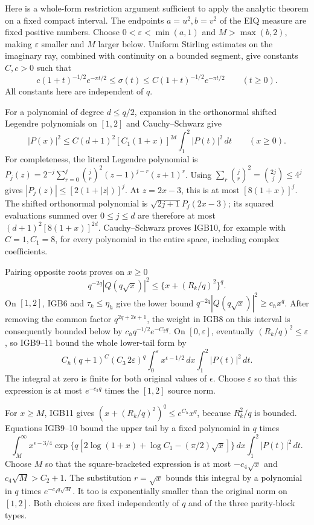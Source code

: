 Here is a whole-form restriction argument sufficient to apply the
analytic theorem on a fixed compact interval. The endpoints
$a=u^2,b=v^2$ of the EIQ measure are fixed positive numbers.
Choose $0<\varepsilon<\min(a,1)$ and $M>\max(b,2)$, making
$\varepsilon$ smaller and $M$ larger below.
Uniform Stirling estimates on the imaginary ray, combined with
continuity on a bounded segment, give constants $C,c>0$ such that
\[
 c(1+t)^{-1/2}e^{-\pi t/2}
 \leq\sigma(t)\leq
 C(1+t)^{-1/2}e^{-\pi t/2}\qquad(t\geq0).
 \tag{IGB9}
\]
All constants here are independent of $q$.

For a polynomial of degree $d\leq q/2$, expansion in the
orthonormal shifted Legendre polynomials on $[1,2]$ and
Cauchy--Schwarz give
\[
 |P(x)|^2\leq C(d+1)^2
        [C_1(1+x)]^{2d}\int_1^2|P(t)|^2\,dt
       \qquad(x\geq0).
 \tag{IGB10}
\]
For completeness, the literal Legendre polynomial is
$P_j(z)=2^{-j}\sum_{r=0}^j\binom jr^2
(z-1)^{j-r}(z+1)^r$.
Using $\sum_r\binom jr^2=\binom{2j}j\leq4^j$ gives
$|P_j(z)|\leq[2(1+|z|)]^j$.
At $z=2x-3$, this is at most $[8(1+x)]^j$.
The shifted orthonormal polynomial is
$\sqrt{2j+1}P_j(2x-3)$; its squared evaluations summed over
$0\leq j\leq d$ are therefore at most
$(d+1)^2[8(1+x)]^{2d}$.
Cauchy--Schwarz proves IGB10, for example with $C=1,C_1=8$,
for every polynomial in the entire space, including complex coefficients.

Pairing opposite roots proves on $x\geq0$
\[
 q^{-2q}|Q(q\sqrt{x})|^2
 \leq \{x+(R_k/q)^2\}^{q}.
 \tag{IGB11}
\]
On $[1,2]$, IGB6 and $\tau_k\leq\eta_h$ give the lower bound
$q^{-2q}|Q(q\sqrt{x})|^2\geq c_hx^q$.
After removing the common factor $q^{2q+2\epsilon+1}$,
the weight in IGB8 on this interval is consequently bounded
below by $c_hq^{-1/2}e^{-C_2q}$. On $[0,\varepsilon]$,
eventually $(R_k/q)^2\leq\varepsilon$, so IGB9--11 bound the
whole lower-tail form by
\[
 C_h(q+1)^C(C_3\,2\varepsilon)^q
       \int_0^\varepsilon x^{\epsilon-1/2}\,dx
       \int_1^2|P(t)|^2\,dt.
\]
The integral at zero is finite for both original values of
$\epsilon$. Choose $\varepsilon$ so that this expression
is at most $e^{-c_3q}$ times the $[1,2]$ source norm.

For $x\geq M$, IGB11 gives
$(x+(R_k/q)^2)^q\leq e^{C_h}x^q$, because
$R_k^2/q$ is bounded. Equations IGB9--10 bound the upper tail
by a fixed polynomial in $q$ times
\[
 \int_M^\infty x^{\epsilon-3/4}
  \exp\{q[2\log(1+x)+\log C_1-(\pi/2)\sqrt{x}]\}\,dx
       \int_1^2|P(t)|^2\,dt .
\]
Choose $M$ so that the square-bracketed expression is at most
$-c_4\sqrt{x}$ and $c_4\sqrt M>C_2+1$. The substitution
$r=\sqrt{x}$ bounds this integral by a polynomial in $q$
times $e^{-c_4q\sqrt M}$. It too is exponentially smaller
than the original norm on $[1,2]$.
Both choices are fixed independently of $q$ and of the three
parity-block types.

